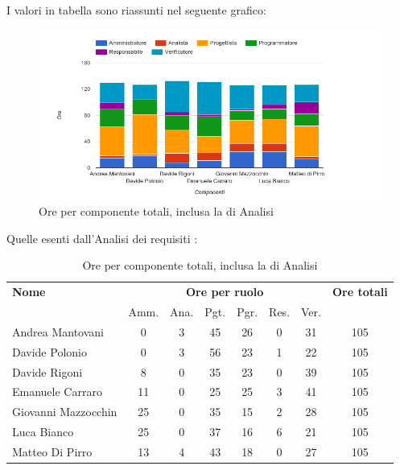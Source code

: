 I valori in tabella sono riassunti nel seguente grafico: \\ 

    \begin{figure}[H]
      \begin{center}
        \includegraphics[width=15cm]{res/img/suddivisioneRuoloProspettoOrario/orePerComponenteTotaliConAnalisi.png}
      \caption{Ore per componente totali, inclusa la  di Analisi}
      \end{center} 
    \end{figure}    
    

Quelle esenti dall'Analisi dei requisiti :

\begin{table}[H]
\begin{tabular}{lccccccc}
\toprule
    \textbf{Nome}  & \multicolumn{6}{c}{\textbf{Ore per ruolo}} & \textbf{Ore totali} \\
     & Amm. & Ana. & Pgt. & Pgr. & Res. & Ver. & \\
    \midrule
   
	   Andrea Mantovani & 0 & 3 & 45 & 26 & 0 & 31 & 105 \\
	     Davide Polonio & 0 & 3 & 56 & 23 & 1 & 22 & 105 \\
	      Davide Rigoni & 8 & 0 & 35 & 23 & 0 & 39 & 105 \\
	   Emanuele Carraro & 11 & 0 & 25 & 25 & 3 & 41 & 105 \\
	Giovanni Mazzocchin & 25 & 0 & 35 & 15 & 2 & 28 & 105 \\
	        Luca Bianco & 25 & 0 & 37 & 16 & 6 & 21 & 105 \\
	    Matteo Di Pirro & 13 & 4 & 43 & 18 & 0 & 27 & 105 \\
   
    \bottomrule
\end{tabular}
\caption{Ore per componente totali, inclusa la  di Analisi}
\end{table}

